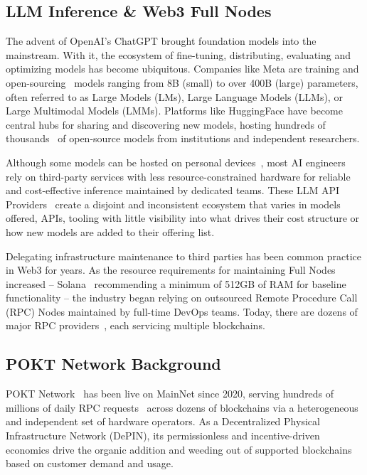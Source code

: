 \documentclass[conference,compsoc]{IEEEtran}
\begin{document}
\subsection{ LLM Inference \& Web3 Full Nodes}
The advent of OpenAI’s ChatGPT brought foundation models into the mainstream. With it, the ecosystem of fine-tuning, distributing, evaluating and optimizing models has become ubiquitous. Companies like Meta are training and open-sourcing~\cite{metaIntroducingMeta} models ranging from 8B (small) to over 400B (large) parameters, often referred to as Large Models (LMs), Large Language Models (LLMs), or Large Multimodal Models (LMMs). Platforms like HuggingFace have become central hubs for sharing and discovering new models, hosting hundreds of thousands~\cite{greataipromptsEveryHugging} of open-source models from institutions and independent researchers.

Although some models can be hosted on personal devices~\cite{pytorchExecuTorchAlpha}, most AI engineers~\cite{latentRiseEngineer} rely on third-party services with less resource-constrained hardware for reliable and cost-effective inference maintained by dedicated teams. These LLM API Providers~\cite{artificialanalysisProviderLeaderboard} create a disjoint and inconsistent ecosystem that varies in models offered, APIs, tooling with little visibility into what drives their cost structure or how new models are added to their offering list.

Delegating infrastructure maintenance to third parties has been common practice in Web3 for years. As the resource requirements for maintaining Full Nodes~\cite{bitcoinRunningFull} increased – Solana~\cite{solanalabsSolanaValidator} recommending a minimum of 512GB of RAM for baseline functionality – the industry began relying on outsourced Remote Procedure Call (RPC) Nodes maintained by full-time DevOps teams. Today, there are dozens of major RPC providers~\cite{rpclistRPCListFind}, each servicing multiple blockchains.

\subsection{POKT Network Background}

POKT Network~\cite{poktWeb3Infrastructure} has been live on MainNet since 2020, serving hundreds of millions of daily RPC requests~\cite{poktscan} across dozens of blockchains via a heterogeneous and independent set of hardware operators. As a Decentralized Physical Infrastructure Network (DePIN), its permissionless and incentive-driven economics drive the organic addition and weeding out of supported blockchains based on customer demand and usage.
\end{document}
